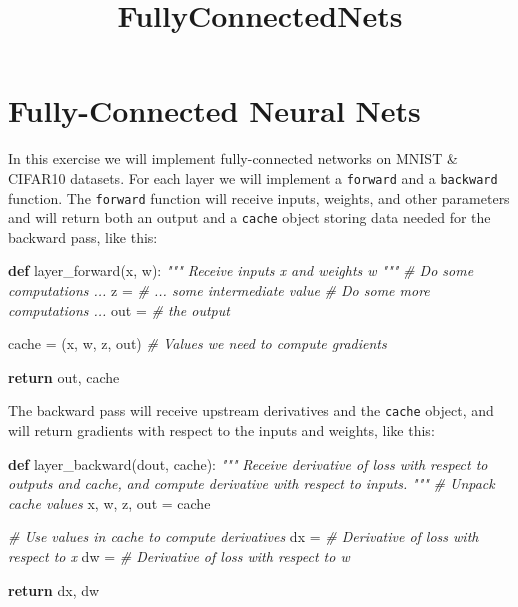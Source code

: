 \documentclass[11pt]{article}
\title{FullyConnectedNets}
\newenvironment{Shaded}{}{}
\newcommand{\KeywordTok}[1]{\textcolor[rgb]{0.00,0.44,0.13}{\textbf{{#1}}}}
\newcommand{\CommentTok}[1]{\textcolor[rgb]{0.38,0.63,0.69}{\textit{{#1}}}}
\newcommand{\NormalTok}[1]{{#1}}
\newcommand{\ControlFlowTok}[1]{\textcolor[rgb]{0.00,0.44,0.13}{\textbf{{#1}}}}
\newcommand{\OperatorTok}[1]{\textcolor[rgb]{0.40,0.40,0.40}{{#1}}}
\begin{document}
    
    
    \maketitle
    
    

    
    \section{Fully-Connected Neural Nets}\label{fully-connected-neural-nets}

In this exercise we will implement fully-connected networks on MNIST \&
CIFAR10 datasets. For each layer we will implement a \texttt{forward}
and a \texttt{backward} function. The \texttt{forward} function will
receive inputs, weights, and other parameters and will return both an
output and a \texttt{cache} object storing data needed for the backward
pass, like this:

\begin{Shaded}
\begin{Highlighting}[]
\KeywordTok{def} \NormalTok{layer_forward(x, w):}
  \CommentTok{""" Receive inputs x and weights w """}
  \CommentTok{# Do some computations ...}
  \NormalTok{z }\OperatorTok{=} \CommentTok{# ... some intermediate value}
  \CommentTok{# Do some more computations ...}
  \NormalTok{out }\OperatorTok{=} \CommentTok{# the output}
   
  \NormalTok{cache }\OperatorTok{=} \NormalTok{(x, w, z, out) }\CommentTok{# Values we need to compute gradients}
   
  \ControlFlowTok{return} \NormalTok{out, cache}
\end{Highlighting}
\end{Shaded}

The backward pass will receive upstream derivatives and the
\texttt{cache} object, and will return gradients with respect to the
inputs and weights, like this:

\begin{Shaded}
\begin{Highlighting}[]
\KeywordTok{def} \NormalTok{layer_backward(dout, cache):}
  \CommentTok{"""}
\CommentTok{  Receive derivative of loss with respect to outputs and cache,}
\CommentTok{  and compute derivative with respect to inputs.}
\CommentTok{  """}
  \CommentTok{# Unpack cache values}
  \NormalTok{x, w, z, out }\OperatorTok{=} \NormalTok{cache}
  
  \CommentTok{# Use values in cache to compute derivatives}
  \NormalTok{dx }\OperatorTok{=} \CommentTok{# Derivative of loss with respect to x}
  \NormalTok{dw }\OperatorTok{=} \CommentTok{# Derivative of loss with respect to w}
  
  \ControlFlowTok{return} \NormalTok{dx, dw}
\end{Highlighting}
\end{Shaded}
\end{document}
